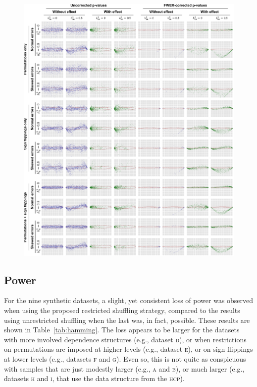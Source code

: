 \begin{figure}[!tp]
\centering
\hspace*{-5mm}\includegraphics[width=\textwidth]{figures/bland_altman.pdf}
\label{fig:bland_altman_noref}
\end{figure}

\subsection{Power}

For the nine synthetic datasets, a slight, yet consistent loss of power was observed when using the proposed restricted shuffling strategy, compared to the results using unrestricted shuffling when the last was, in fact, possible. These results are shown in Table~\ref{tab:hamming}. The loss appears to be larger for the datasets with more involved dependence structures (e.g., dataset \textsc{d}), or when restrictions on permutations are imposed at higher levels (e.g., dataset \textsc{e}), or on sign flippings at lower levels (e.g., datasets \textsc{f} and \textsc{g}). Even so, this is not quite as conspicuous with samples that are just modestly larger (e.g., \textsc{a} and \textsc{b}), or much larger (e.g., datasets \textsc{h} and \textsc{i}, that use the data structure from the \textsc{hcp}).

